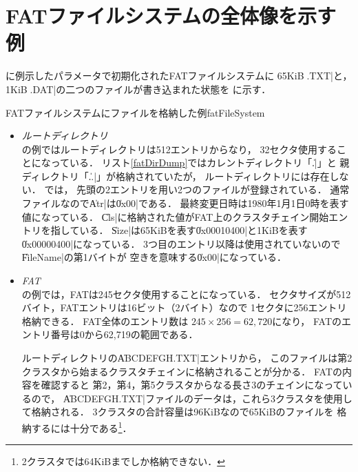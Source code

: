 

\section{FATファイルシステムの全体像を示す例}
に例示したパラメータで初期化されたFATファイルシステムに
65KiBの\|\ABCDEFGH.TXT|と，
1KiBの\|\SAMPLE.DAT|の二つのファイルが書き込まれた状態を
に示す．

         {FATファイルシステムにファイルを格納した例}{fatFileSystem}

\begin{itemize}
\item \emph{ルートディレクトリ}\\
  の例ではルートディレクトリは512エントリからなり，
  32セクタ使用することになっている．
  リスト\ref{fatDirDump}ではカレントディレクトリ「\|.|」と
  親ディレクトリ「\|..|」が格納されていたが，
  ルートディレクトリには存在しない．
  では，
  先頭の2エントリを用い2つのファイルが登録されている．
  通常ファイルなので\|Atr|は\|0x00|である．
  最終変更日時は1980年1月1日0時を表す値になっている．
  \|Cls|に格納された値がFAT上のクラスタチェイン開始エントリを指している．
  \|Size|は65KiBを表す\|0x00010400|と1KiBを表す\|0x00000400|になっている．
  3つ目のエントリ以降は使用されていないので\|FileName|の第1バイトが
  空きを意味する\|0x00|になっている．

\item \emph{FAT}\\
  の例では，FATは245セクタ使用することになっている．
  セクタサイズが512バイト，FATエントリは16ビット（2バイト）なので
  1セクタに256エントリ格納できる．
  FAT全体のエントリ数は
  $245 \times 256 = 62,720$になり，
  FATのエントリ番号は0から62,719の範囲である．

  ルートディレクトリの\|ABCDEFGH.TXT|エントリから，
  このファイルは第2クラスタから始まるクラスタチェインに格納されることが分かる．
  FATの内容を確認すると
  第2，第4，第5クラスタからなる長さ3のチェインになっているので，
  \|ABCDEFGH.TXT|ファイルのデータは，これら3クラスタを使用して格納される．
  3クラスタの合計容量は96KiBなので65KiBのファイルを
  格納するには十分である\footnote{2クラスタでは64KiBまでしか格納できない．}．


\end{itemize}
